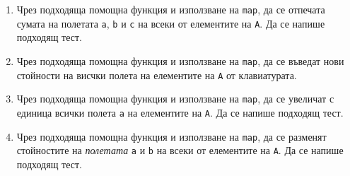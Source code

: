 \documentclass[12pt,a4paper]{article}
\begin{document}
\begin{enumerate}
\begin{enumerate}
	\item Чрез подходяща помощна функция и използване на \texttt{map}, да се отпечата сумата на полетата \texttt{a}, \texttt{b} и \texttt{c} на всеки от елементите на \texttt{A}. Да се напише подходящ тест.
	\item Чрез подходяща помощна функция и използване на \texttt{map}, да се въведат нови стойности на висчки полета на елементите на \texttt{A} от клавиатурата.
	\item Чрез подходяща помощна функция и използване на \texttt{map}, да се увеличат с единица всички полета \texttt{a} на елементите на \texttt{A}. Да се напише подходящ тест.
	\item Чрез подходяща помощна функция и използване на \texttt{map}, да се разменят стойностите на \emph{полетата} \texttt{a} и \texttt{b} на всеки от елементите на \texttt{A}. Да се напише подходящ тест.


\end{enumerate}

\end{enumerate}


	\vspace{20px}
\end{document}
